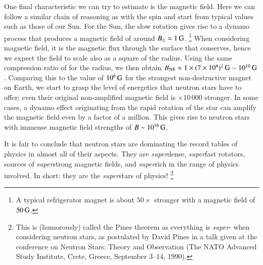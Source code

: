One final characteristic we can try to estimate is the magnetic field. %
Here we can follow a similar chain of reasoning as with the spin and start from typical values such as those of our Sun.
For the Sun, the slow rotation gives rise to a dynamo process that produces a magnetic field of around $B_{\odot} \approx 1\, \mathrm{G}$.%
\footnote{A typical refrigerator magnet is about $50\times$ stronger with a magnetic field of $50\, \mathrm{G}$.}
When considering magnetic field, it is the magnetic flux through the surface that conserves, hence we expect the field to scale also as a square of the radius.
Using the same compression ratio of  for the radius, we then obtain $B_{\mathrm{NS}} \approx 1 \times (7 \times 10^{4})^2 \, \mathrm{G} \sim 10^{10} \, \mathrm{G}$.
Comparing this to the value of $10^6\, \mathrm{G}$ for the strongest non-destructive magnet on Earth, we start to grasp the level of energetics that neutron stars have to offer; even their original non-amplified magnetic field is $\times 10\,000$ stronger.
In some cases, a dynamo effect originating from the rapid rotation of the star can amplify the magnetic field even by a factor of a million. 
This gives rise to neutron stars with immense magnetic field strengths of $B \sim 10^{16} \, \mathrm{G}$.

It is fair to conclude that neutron stars are dominating the record tables of physics in almost all of their aspects.
They are \emph{super}dense, \emph{super}fast rotators, sources of \emph{super}strong magnetic fields, and \emph{super}rich in the range of physics involved.
In short: they are the \emph{super}stars of physics!%
\footnote{
    This is (humorously) called the Pines theorem as everything is \emph{super}- when considering neutron stars, as postulated by David Pines in a talk given at the conference on Neutron Stars: Theory and Observation (The NATO Advanced Study Institute, Crete, Greece, September 3–14, 1990).
}
